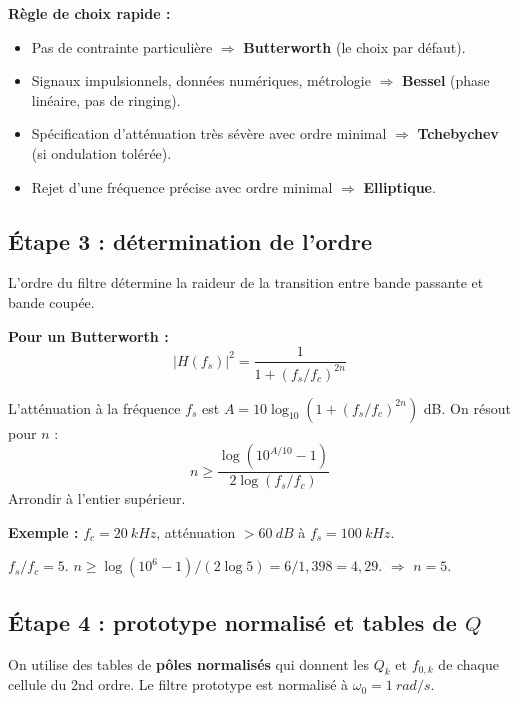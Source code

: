 \documentclass[12pt,a4paper,twoside]{book}
\begin{document}
\begin{intuition}
\textbf{Règle de choix rapide :}
\begin{itemize}[nosep]
\item Pas de contrainte particulière $\Rightarrow$ \textbf{Butterworth} (le choix par défaut).
\item Signaux impulsionnels, données numériques, métrologie $\Rightarrow$ \textbf{Bessel} (phase linéaire, pas de ringing).
\item Spécification d'atténuation très sévère avec ordre minimal $\Rightarrow$ \textbf{Tchebychev} (si ondulation tolérée).
\item Rejet d'une fréquence précise avec ordre minimal $\Rightarrow$ \textbf{Elliptique}.
\end{itemize}
\end{intuition}

\subsection{Étape 3 : détermination de l'ordre}

L'ordre du filtre détermine la raideur de la transition entre bande passante et bande coupée.

\begin{formule}
\textbf{Pour un Butterworth :}
\[
|H(f_s)|^2 = \frac{1}{1+(f_s/f_c)^{2n}}
\]

L'atténuation à la fréquence $f_s$ est $A = 10\log_{10}(1+(f_s/f_c)^{2n})$ dB. On résout pour $n$ :
\[
\boxed{n \geq \frac{\log(10^{A/10} - 1)}{2\log(f_s/f_c)}}
\]
Arrondir à l'entier supérieur.
\end{formule}

\begin{pratique}
\textbf{Exemple :} $f_c = \SI{20}{kHz}$, atténuation $> \SI{60}{dB}$ à $f_s = \SI{100}{kHz}$.

$f_s/f_c = 5$. $n \geq \log(10^6-1)/(2\log5) = 6/1{,}398 = 4{,}29$. $\Rightarrow$ $n = 5$.
\end{pratique}

\subsection{Étape 4 : prototype normalisé et tables de $Q$}

On utilise des tables de \textbf{pôles normalisés} qui donnent les $Q_k$ et $f_{0,k}$ de chaque cellule du 2nd ordre. Le filtre prototype est normalisé à $\omega_0 = \SI{1}{rad/s}$.
\end{document}
